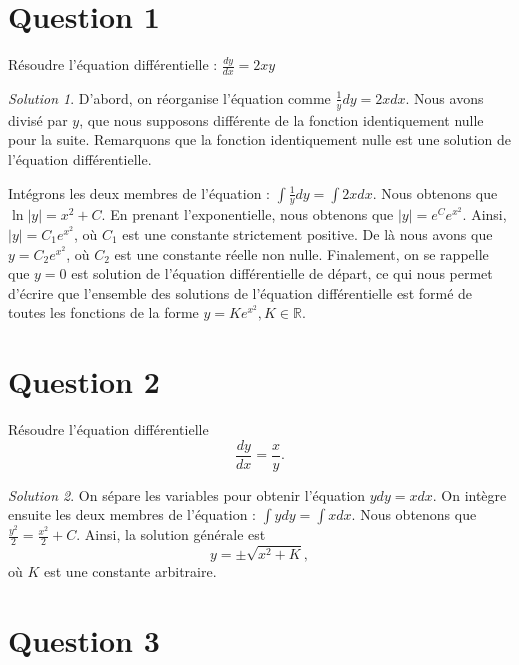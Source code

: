 \documentclass[
  12pt,
  letterpaper,
]{book}
\theoremstyle{remark}
\newtheorem*{solution}{Solution}
\begin{document}
\hypertarget{question-1-4}{%
\section{Question 1}\label{question-1-4}}

Résoudre l'équation différentielle : \(\frac{dy}{dx} = 2xy\)

\begin{solution}

D'abord, on réorganise l'équation comme \(\frac{1}{y}dy = 2x dx\). Nous
avons divisé par \(y\), que nous supposons différente de la fonction
identiquement nulle pour la suite. Remarquons que la fonction
identiquement nulle est une solution de l'équation différentielle.

Intégrons les deux membres de l'équation :
\(\int \frac{1}{y}dy = \int 2x dx\). Nous obtenons
que\(\ln|y| = x^2 + C\). En prenant l'exponentielle, nous obtenons que
\(|y|=e^{C}e^{x^2}\). Ainsi, \(|y|=C_1e^{x^2}\), où \(C_1\) est une
constante strictement positive. De là nous avons que \(y=C_2e^{x^2}\),
où \(C_2\) est une constante réelle non nulle. Finalement, on se
rappelle que \(y=0\) est solution de l'équation différentielle de
départ, ce qui nous permet d'écrire que l'ensemble des solutions de
l'équation différentielle est formé de toutes les fonctions de la forme
\(y=Ke^{x^2}, K\in\mathbb{R}\).

\end{solution}

\hypertarget{question-2-4}{%
\section{Question 2}\label{question-2-4}}

Résoudre l'équation différentielle \[\frac{dy}{dx} = \frac{x}{y}.\]

\begin{solution}

On sépare les variables pour obtenir l'équation \(y dy = x dx\). On
intègre ensuite les deux membres de l'équation :
\(\int y dy = \int x dx\). Nous obtenons que
\(\frac{y^2}{2} = \frac{x^2}{2} + C\). Ainsi, la solution générale est
\[y = \pm\sqrt{x^2 + K},\] où \(K\) est une constante arbitraire.

\end{solution}

\hypertarget{question-3-4}{%
\section{Question 3}\label{question-3-4}}
\end{document}
